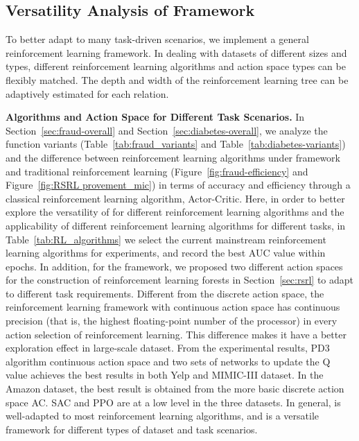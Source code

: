 \subsection{Versatility Analysis of \RSRL Framework}\label{sec:versatility}
To better adapt to many task-driven scenarios, we implement a general \RSRL reinforcement learning framework. 
In dealing with datasets of different sizes and types, different reinforcement learning algorithms and action space types can be flexibly matched. 
The depth and width of the reinforcement learning tree can be adaptively estimated for each relation. 


\textbf{Algorithms and Action Space for Different Task Scenarios. }
In Section~\ref{sec:fraud-overall} and Section~\ref{sec:diabetes-overall}, we analyze the function variants (Table~\ref{tab:fraud_variants} and Table~\ref{tab:diabetes-variants}) and the difference between reinforcement learning algorithms under \RSRL framework and traditional reinforcement learning (Figure~\ref{fig:fraud-efficiency} and Figure~\ref{fig:RSRL provement_mic}) in terms of accuracy and efficiency through a classical reinforcement learning algorithm, Actor-Critic.
Here, in order to better explore the versatility of \RioGNN for different reinforcement learning algorithms and the applicability of different reinforcement learning algorithms for different tasks, in Table~\ref{tab:RL_algorithms} we select the current mainstream reinforcement learning algorithms for experiments, and record the best AUC value within  epochs. 
In addition, for the \RSRL framework, we proposed two different action spaces for the construction of reinforcement learning forests in Section~\ref{sec:rsrl} to adapt to different task requirements.
Different from the discrete action space, the reinforcement learning framework with continuous action space has continuous precision (that is, the highest floating-point number of the processor) in every action selection of reinforcement learning. 
This difference makes it have a better exploration effect in large-scale dataset.
From the experimental results, PD3 algorithm continuous action space and two sets of networks to update the Q value achieves the best results in both Yelp and MIMIC-III dataset. 
In the Amazon dataset, the best result is obtained from the more basic discrete action space AC. SAC and PPO are at a low level in the three datasets. 
In general, \RioGNN is well-adapted to most reinforcement learning algorithms, and is a versatile framework for different types of dataset and task scenarios.





